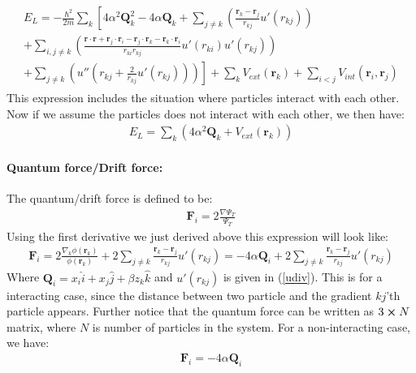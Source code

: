 \documentclass[a4paper, 10pt]{article}
\begin{document}
\begin{appendices}
\begin{align}
		\begin{split}
		E_{L} = -\frac{\hbar^{2}}{2m}\sum_{k}\left[
		4\alpha^{2}\boldsymbol{Q}_{k}^{2} - 4\alpha\boldsymbol{Q}_{k} + \sum_{j \neq k}\left(\frac{\boldsymbol{r}_{k} - \boldsymbol{r}_{j}}{r_{kj}}u'(r_{kj})\right)\right.
		\\ \left. + \sum_{i,j \neq k}\left(\frac{\boldsymbol{r}\cdot\boldsymbol{r} + \boldsymbol{r}_{j}\cdot\boldsymbol{r}_{i} - \boldsymbol{r}_{j}\cdot\boldsymbol{r}_{k} -\boldsymbol{r}_{k}\cdot\boldsymbol{r}_{i}}{r_{ki}r_{kj}}u'(r_{ki})u'(r_{kj})\right)\right.
		\\
		\left. + \sum_{j \neq k}\left(u''(r_{kj} + \frac{2}{r_{kj}}u'(r_{kj}))\right)\right]
		+ \sum_{k}V_{ext}(\boldsymbol{r}_{k}) + \sum_{i < j}V_{int}(\boldsymbol{r}_{i}, \boldsymbol{r}_{j})
		\end{split}
		\end{align}
		This expression includes the situation where particles interact with each other.
		Now if we assume the particles does not interact with each other, we then have:
		\begin{align}
		E_{L} = \sum_{k}\left(4\alpha^{2}\boldsymbol{Q}_{k} + V_{ext}(\boldsymbol{r}_{k}) \right)
		\end{align}
		\paragraph{Quantum force/Drift force:}
		The quantum/drift force is defined to be:
		\begin{align}
		\boldsymbol{F}_{i} = 2\frac{\nabla\Psi_{T}}{\Psi_{T}}
		\end{align}
		Using the first derivative we just derived above this expression will look like:
		\begin{align}
		\boldsymbol{F}_{i} = 2\frac{\nabla_k \phi(\boldsymbol{r}_{k})}{\phi(\boldsymbol{r}_{k})}
		+
		2\sum_{j \neq k}\frac{\boldsymbol{r}_{k} - \boldsymbol{r}_{j}}{r_{kj}}u'(r_{kj})
		= -4\alpha\boldsymbol{Q}_{i} +
		2\sum_{j \neq k}\frac{\boldsymbol{r}_{k} - \boldsymbol{r}_{j}}{r_{kj}}u'(r_{kj})
		\end{align}
		Where $\boldsymbol{Q}_{i} = x_{i}\hat{i} + x_{j}\hat{j} + \beta z_{k}\hat{k}$ and
		$u'(r_{kj})$ is given in (\ref{udiv}). This is for a interacting case, since
		the distance between two particle and the gradient $kj$'th particle appears.
		Further notice that the quantum force can be written
		as $3\cross N$ matrix, where $N$ is number of particles in the system.
		For a non-interacting case, we have:
		\begin{align}
		\boldsymbol{F}_{i} = -4\alpha\boldsymbol{Q}_{i}
		\end{align}

\end{appendices}
\end{document}
